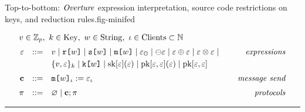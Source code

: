 \begin{fpfig}[t]{Top-to-bottom: $\mathit{Overture}$ expression interpretation, source code restrictions on keys, and reduction rules.}{fig-minifed}
  {\small
    $$
    \begin{array}{rcl@{\hspace{8mm}}r}
      \multicolumn{4}{l}{v \in \mathbb{Z}_p,\ k \in \mathrm{Key},\ w \in \mathrm{String},\ \cid \in \mathrm{Clients} \subset  \mathbb{N} }\\[2mm] %
      \be &::=& v \mid \flip{w} \mid \secret{w} \mid \mesg{w} \mid \elab{\be}{\Oracle} \mid \ominus \be \mid \be \oplus \be \mid \be \otimes \be \mid & \textit{expressions}\\[1mm]
      & &  \ctxt{v,\be}{k} \mid \key{w} \mid \sk{\be}(\be) \mid \pk{\be}{\be}(\be) \mid \pk{\be}{\be} \\[2mm]
      \instr &::=& \eassign{\mesg{w}}{\cid}{\be}{\cid} & \textit{message send} \\[2mm]
      \prog &::=& \varnothing \mid \instr; \prog & \textit{protocols}
    \end{array}
    $$
  
  \rule{130mm}{0.5pt}

}
\end{fpfig}
